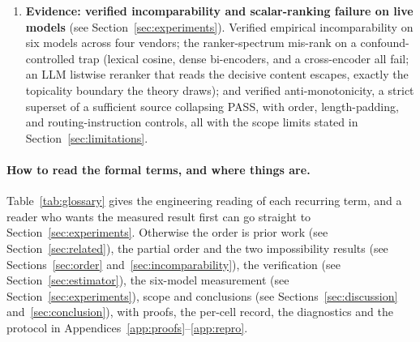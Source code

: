 \documentclass[11pt]{article}
\theoremstyle{plain}
\theoremstyle{definition}
\theoremstyle{remark}
\begin{document}
\begin{enumerate}
  model behind a real verifier.
  \item[\textbf{(C3)}] \textbf{Evidence: verified incomparability and scalar-ranking failure on
  live models} (see Section~\ref{sec:experiments}). Verified empirical incomparability on six models across
  four vendors; the ranker-spectrum mis-rank on a confound-controlled trap (lexical cosine, dense
  bi-encoders, and a cross-encoder all fail; an LLM listwise reranker that reads the decisive
  content escapes, exactly the topicality boundary the theory draws); and verified
  anti-monotonicity, a strict superset of a sufficient source collapsing PASS, with order,
  length-padding, and routing-instruction controls, all with the scope limits stated in
  Section~\ref{sec:limitations}.
\end{enumerate}

\paragraph{How to read the formal terms, and where things are.}
Table~\ref{tab:glossary} gives the engineering reading of each recurring term, and a reader who
wants the measured result first can go straight to Section~\ref{sec:experiments}. Otherwise the order is
prior work (see Section~\ref{sec:related}), the partial order and the two impossibility results
(see Sections~\ref{sec:order} and~\ref{sec:incomparability}), the verification
(see Section~\ref{sec:estimator}), the six-model measurement (see Section~\ref{sec:experiments}), scope and
conclusions (see Sections~\ref{sec:discussion} and~\ref{sec:conclusion}), with proofs, the per-cell record,
the diagnostics and the protocol in Appendices~\ref{app:proofs}--\ref{app:repro}.
\end{document}
